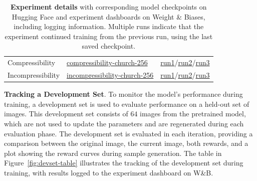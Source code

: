 \begin{appendixs}
\begin{table}[h!]
\begin{tabular}{l l l}
            Compressibility & \href{https://huggingface.co/alkzar90/ddpo-compressibility-church-256}{compressibility-church-256} & \href{https://wandb.ai/alcazar90/ddpo-compressibility-ddpm-church256/runs/urd2hwd9}{run1}/\href{https://wandb.ai/alcazar90/ddpo-compressibility-ddpm-church256/runs/7205y5cb}{run2}/\href{https://wandb.ai/alcazar90/ddpo-compressibility-ddpm-church256/runs/82snqejo}{run3} \\
            Incompressibility & \href{https://huggingface.co/alkzar90/ddpo-incompressibility-church-256}{incompressibility-church-256} & \href{https://wandb.ai/alcazar90/ddpo-incompressibility-ddpm-church256/runs/jmbu5cgn}{run1}/\href{https://wandb.ai/alcazar90/ddpo-incompressibility-ddpm-church256/runs/320xik9f}{run2}/\href{https://wandb.ai/alcazar90/ddpo-incompressibility-ddpm-church256/runs/l0zqgs80}{run3} \\
            \bottomrule
        \end{tabular}
        \captionsetup{width=\textwidth} %
        \caption{\textbf{Experiment details} with corresponding model checkpoints on Hugging Face and experiment dashboards on Weight \& Biases, including logging information. Multiple runs indicate that the experiment continued training from the previous run, using the last saved checkpoint.}
        \label{tab:experiment_details}
    \end{table}


    \noindent \textbf{Tracking a Development Set}. To monitor the model's performance during training, a development set is used to evaluate performance on a held-out set of images. This development set consists of $64$ images from the pretrained model, which are not used to update the parameters and are regenerated during each evaluation phase. The development set is evaluated in each iteration, providing a comparison between the original image, the current image, both rewards, and a plot showing the reward curves during sample generation. The table in Figure~\ref{fig:devset-table} illustrates the tracking of the development set during training, with results logged to the experiment dashboard on W\&B. \\


\end{appendixs}
